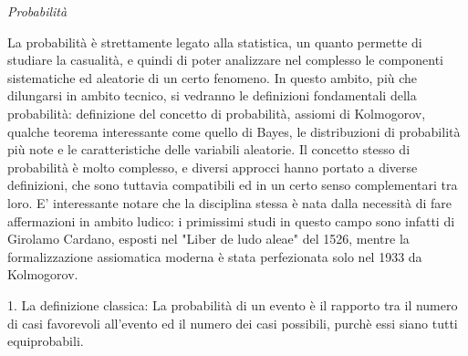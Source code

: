 \documentclass{book}
\begin{document}


		\emph{Probabilit\`{a}}

La probabilit\`{a} \`{e} strettamente legato alla statistica, un quanto permette di studiare la casualit\`{a}, e quindi di poter analizzare nel complesso le componenti sistematiche ed aleatorie di un certo fenomeno. In questo ambito, più che dilungarsi in ambito tecnico, si vedranno le definizioni fondamentali della probabilit\`{a}: definizione del concetto di probabilit\`{a}, assiomi di Kolmogorov, qualche teorema interessante come quello di Bayes, le distribuzioni di probabilit\`{a} più note e le caratteristiche delle variabili aleatorie.
Il concetto stesso di probabilit\`{a} \`{e} molto complesso, e diversi approcci hanno portato a diverse definizioni, che sono tuttavia compatibili ed in un certo senso complementari tra loro. E' interessante notare che la disciplina stessa \`{e} nata dalla necessit\`{a} di fare affermazioni in ambito ludico: i primissimi studi in questo campo sono infatti di Girolamo Cardano, esposti nel "Liber de ludo aleae" del 1526, mentre la formalizzazione assiomatica moderna \`{e} stata perfezionata solo nel 1933 da Kolmogorov.

1. La definizione classica:
La probabilit\`{a} di un evento \`{e} il rapporto tra il numero di casi favorevoli all'evento ed il numero dei casi possibili, purch\`{e} essi siano tutti equiprobabili.
\end{document}
